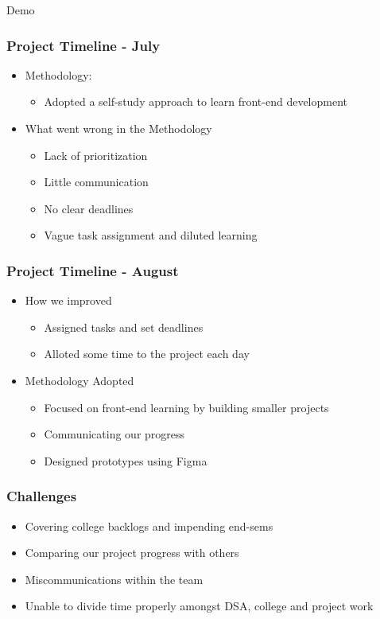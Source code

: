 \documentclass{beamer}
\begin{document}
\begin{frame}
    \center\Huge Demo
\end{frame}

\begin{frame}
\frametitle{Project Timeline - July}
  \begin{itemize}
    \item Methodology:
    \begin{itemize}
      \item Adopted a self-study approach to learn front-end development 
    \end{itemize}
    \item What went wrong in the Methodology
    \begin{itemize}
      \item Lack of prioritization
      \item Little communication
      \item No clear deadlines
      \item Vague task assignment and diluted learning
    \end{itemize}
  \end{itemize}

\end{frame}
\begin{frame}
  \frametitle{Project Timeline - August}
  \begin{itemize}
    \item How we improved
    \begin{itemize}
      \item Assigned tasks and set deadlines
      \item Alloted some time to the project each day
    \end{itemize}
    \item Methodology Adopted
    \begin{itemize}
      \item Focused on front-end learning by building smaller projects
      \item Communicating our progress
      \item Designed prototypes using Figma
    \end{itemize}
  \end{itemize}
\end{frame}

\begin{frame}
  \frametitle{Challenges}
  \begin{itemize}
    \item Covering college backlogs and impending end-sems
    \item Comparing our project progress with others
    \item Miscommunications within the team
    \item Unable to divide time properly amongst DSA, college and project work
  \end{itemize}
  \end{frame}
\end{document}
